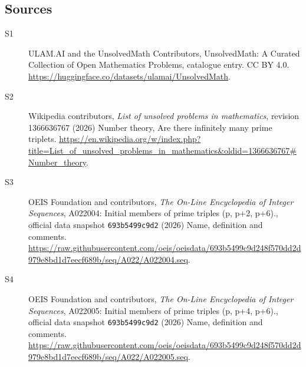 \documentclass[11pt]{article}
\begin{document}
\subsection{Sources}
\begin{description}
\item[\hypertarget{source:statement:1}{S1}] ULAM.AI and the UnsolvedMath Contributors, UnsolvedMath: A Curated Collection of Open Mathematics Problems, catalogue entry. CC BY 4.0. \url{https://huggingface.co/datasets/ulamai/UnsolvedMath}.
\item[\hypertarget{source:statement:2}{S2}] Wikipedia contributors, \emph{List of unsolved problems in mathematics}, revision 1366636767 (2026) Number theory, Are there infinitely many prime triplets. \url{https://en.wikipedia.org/w/index.php?title=List_of_unsolved_problems_in_mathematics&oldid=1366636767#Number_theory}.
\item[\hypertarget{source:statement:3}{S3}] OEIS Foundation and contributors, \emph{The On-Line Encyclopedia of Integer Sequences}, A022004: Initial members of prime triples (p, p+2, p+6)., official data snapshot \texttt{693b5499c9d2} (2026) Name, definition and comments. \url{https://raw.githubusercontent.com/oeis/oeisdata/693b5499c9d248f570dd2d979e8bd1d7eecf689b/seq/A022/A022004.seq}.
\item[\hypertarget{source:statement:4}{S4}] OEIS Foundation and contributors, \emph{The On-Line Encyclopedia of Integer Sequences}, A022005: Initial members of prime triples (p, p+4, p+6)., official data snapshot \texttt{693b5499c9d2} (2026) Name, definition and comments. \url{https://raw.githubusercontent.com/oeis/oeisdata/693b5499c9d248f570dd2d979e8bd1d7eecf689b/seq/A022/A022005.seq}.
\end{description}
\label{end:statement}
\end{document}
